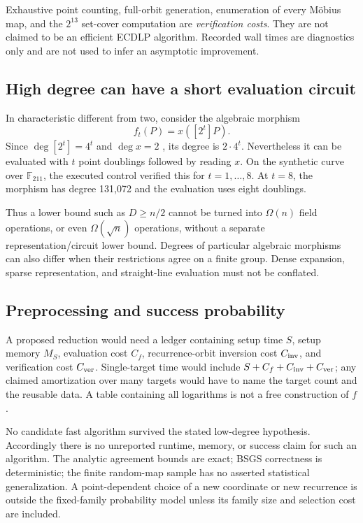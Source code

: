\documentclass[11pt,letterpaper]{article}
\theoremstyle{definition}
\theoremstyle{remark}
\newcommand{\F}{\mathbb F}
\begin{document}
Exhaustive point counting, full-orbit generation, enumeration of every M\"obius map, and the $2^{13}$ set-cover computation are \emph{verification costs}. They are not claimed to be an efficient ECDLP algorithm. Recorded wall times are diagnostics only and are not used to infer an asymptotic improvement.

\subsection{High degree can have a short evaluation circuit}

In characteristic different from two, consider the algebraic morphism
\[
f_t(P)=x([2^t]P).
\]
Since $\deg[2^t]=4^t$ and $\deg x=2$ \cite{milne}, its degree is $2\cdot4^t$. Nevertheless it can be evaluated with $t$ point doublings followed by reading $x$. On the synthetic curve over $\F_{211}$, the executed control verified this for $t=1,\ldots,8$. At $t=8$, the morphism has degree 131,072 and the evaluation uses eight doublings.

Thus a lower bound such as $D\ge n/2$ cannot be turned into $\Omega(n)$ field operations, or even $\Omega(\sqrt n)$ operations, without a separate representation/circuit lower bound. Degrees of particular algebraic morphisms can also differ when their restrictions agree on a finite group. Dense expansion, sparse representation, and straight-line evaluation must not be conflated.

\subsection{Preprocessing and success probability}

A proposed reduction would need a ledger containing setup time $S$, setup memory $M_S$, evaluation cost $C_f$, recurrence-orbit inversion cost $C_{\rm inv}$, and verification cost $C_{\rm ver}$. Single-target time would include $S+C_f+C_{\rm inv}+C_{\rm ver}$; any claimed amortization over many targets would have to name the target count and the reusable data. A table containing all logarithms is not a free construction of $f$.

No candidate fast algorithm survived the stated low-degree hypothesis. Accordingly there is no unreported runtime, memory, or success claim for such an algorithm. The analytic agreement bounds are exact; BSGS correctness is deterministic; the finite random-map sample has no asserted statistical generalization. A point-dependent choice of a new coordinate or new recurrence is outside the fixed-family probability model unless its family size and selection cost are included.
\end{document}
